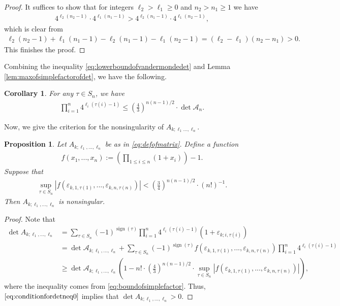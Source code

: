 \documentclass[11pt,letterpaper,reqno]{amsart}
\numberwithin{figure}{section}
\numberwithin{table}{section}
\theoremstyle{definition}
\theoremstyle{plain}
\newtheorem{corollary}{Corollary}[section]
\newtheorem{proposition}[theorem]{Proposition}
\theoremstyle{definition}
\theoremstyle{definition}
\theoremstyle{remark}
\numberwithin{equation}{section}
\theoremstyle{remark}
\DeclareMathOperator{\sign}{sign}
\begin{document}
\begin{proof}
  It suffices to show that for integers $\ell_2>\ell_1\geq0$ and $n_2>n_1\geq1$ we have 
  \begin{align}
      4^{\ell_2(n_2-1)}\cdot 4^{\ell_1(n_1-1)}>4^{\ell_2(n_1-1)}\cdot 4^{\ell_1(n_2-1)}
  ,\end{align}
  which is clear from
  \begin{align}
      \ell_2(n_2-1)+\ell_1(n_1-1)-\ell_2(n_1-1)-\ell_1(n_2-1)=(\ell_2-\ell_1)(n_2-n_1)>0.
  \end{align}
  This finishes the proof.
\end{proof}
Combining the inequality \eqref{eq:lowerboundofvandermondedet} and Lemma \ref{lem:maxofsimplefactorofdet}, we have the following.
\begin{corollary}
    For any $\tau\in S_{n}$, we have 
    \begin{align}
        \prod_{i=1}^{n}4^{\ell_i(\tau(i)-1)}\leq\left(\frac{4}{3}\right)^{n(n-1)/2}\cdot\det\mathscr{A}_n
    .\label{eq:boundofsimplefactor}\end{align}
\end{corollary}
Now, we give the criterion for the nonsingularity of $A_{k;\ell_1...,\ell_n}$.
\begin{proposition}\label{prop:criterionofnonsingularity}\cite[Lemma 2.7]{oddperiods}
    Let $A_{k;\ell_1,...,\ell_n}$ be as in \eqref{eq:defofmatrix}. Define a function 
    \begin{align}f(x_1,...,x_n):=\left(\prod_{1\leq i\leq n}(1+x_{i})\right)-1.\label{eq:defoff}\end{align}
    Suppose that
    \begin{align}
        \sup_{\tau\in S_n}|f(\varepsilon_{k,1,\tau(1)},...,\varepsilon_{k,n,\tau(n)})|<\left(\frac{3}{4}\right)^{n(n-1)/2}\cdot(n!)^{-1}.\label{eq:conditionfordetneq0}
    \end{align}
    Then $A_{k;\ell_1,...,\ell_n}$ is nonsingular.
\end{proposition}
\begin{proof}
Note that 
 \begin{align}
     \det A_{k;\ell_1,...,\ell_n}&=\sum_{\tau\in S_n}(-1)^{\sign(\tau)}\prod_{i=1}^{n}4^{\ell_i(\tau(i)-1)}(1+\varepsilon_{k;i,\tau(i)})\\&=\det\mathscr{A}_{k;\ell_1,...,\ell_n}+\sum_{\tau\in S_n}(-1)^{\sign(\tau)}f(\varepsilon_{k,1,\tau(1)},...,\varepsilon_{k,n,\tau(n)})\prod_{i=1}^n4^{\ell_i(\tau(i)-1)}\\&\geq\det\mathscr{A}_{k;\ell_1,...,\ell_n}\left(1-n!\cdot\left(\frac{4}{3}\right)^{n(n-1)/2}\cdot  \sup_{\tau\in S_n}|f(\varepsilon_{k,1,\tau(1)},...,\varepsilon_{k,n,\tau(n)})|\right),
 \end{align}
 where the inequality comes from \eqref{eq:boundofsimplefactor}. Thus, $\eqref{eq:conditionfordetneq0}$ implies that $\det A_{k;\ell_1,...,\ell_n}>0$.
 \end{proof}
\end{document}
